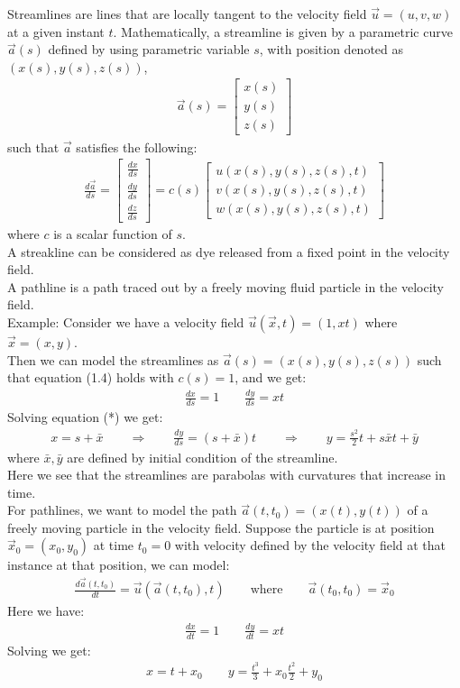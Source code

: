 \documentclass[11pt]{book}
\theoremstyle{break}
\theoremstyle{break}
\newcommand{\bmat}[1]{\begin{bmatrix} #1 \end{bmatrix}}
\newcommand{\example}{\color{green}Example: \color{black}}
\begin{document}
Streamlines are lines that are locally tangent to the velocity field $\vec{u} = (u,v,w)$ at a given instant $t$. Mathematically, a streamline is given by a parametric curve $\vec{a}(s)$ defined by using parametric variable $s$, with position denoted as $(x(s), y(s), z(s))$,
\begin{align}
\vec{a}(s) = \bmat{x(s) \\ y(s) \\ z(s)}
\end{align}
such that $\vec{a}$ satisfies the following:
\begin{align}
\frac{d\vec{a}}{ds} = \bmat{\frac{dx}{ds} \\ \frac{dy}{ds}\\ \frac{dz}{ds}} = c(s) \bmat{u(x(s),y(s),z(s),t)\\ v(x(s),y(s),z(s),t) \\ w(x(s),y(s),z(s),t)}
\end{align}
where $c$ is a scalar function of $s$. \\


A streakline can be considered as dye released from a fixed point in the velocity field. \\
A pathline is a path traced out by a freely moving fluid particle in the velocity field. \\

\example Consider we have a velocity field $\vec{u} (\vec{x},t) = (1,xt)$ where $\vec{x} = (x,y)$.\\

Then we can model the streamlines as $\vec{a}(s)=(x(s),y(s),z(s))$ such that equation (1.4) holds with $c(s) = 1$, and we get:
\begin{align*}
\frac{dx}{ds} = 1\qquad \frac{dy}{ds} = xt \tag{*}
\end{align*}
Solving equation (*) we get:
\begin{align*}
x = s+\bar{x} \qquad\Rightarrow\qquad \frac{dy}{ds} = (s+\bar{x}) t  \qquad\Rightarrow\qquad y= \frac{s^2}{2}t + s\bar{x}t + \bar{y}
\end{align*}
where $\bar{x}, \bar{y}$ are defined by initial condition of the streamline. \\
Here we see that the streamlines are parabolas with curvatures that increase in time. \\

For pathlines, we want to model the path $\vec{a}(t,t_0) = (x(t),y(t))$ of a freely moving particle in the velocity field. Suppose the particle is at position $\vec{x}_0 = (x_0, y_0)$ at time $t_0=0$ with velocity defined by the velocity field at that instance at that position, we can model:
\begin{align*}
\frac{d \vec{a}(t,t_0)}{dt} = \vec{u}(\vec{a}(t,t_0) , t) \qquad \text{where}\qquad \vec{a}(t_0,t_0) = \vec{x}_0
\end{align*}
Here we have:
\begin{align*}
\frac{dx}{dt} = 1\qquad \frac{dy}{dt} =xt
\end{align*}
Solving we get:
\begin{align*}
x = t+x_0\qquad y=\frac{t^3}{3}+x_0\frac{t^2}{2} + y_0
\end{align*}
\end{document}
